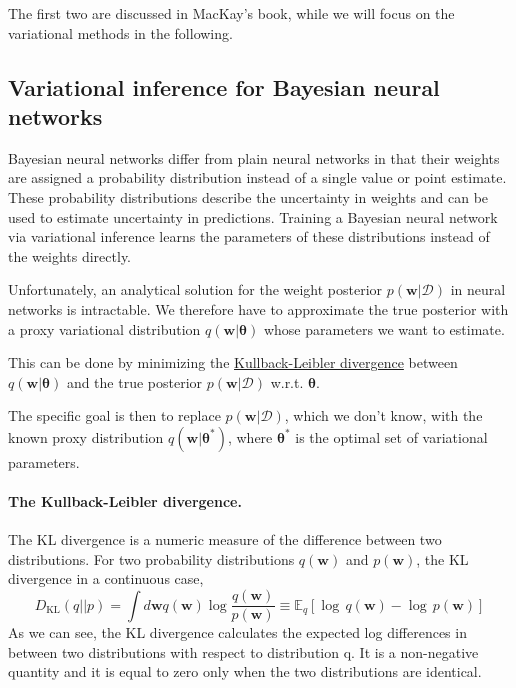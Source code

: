 \documentclass[%
oneside,                 %
final,                   %
10pt]{article}
\begin{document}
\noindent
The first two are discussed in MacKay's book, while we will focus on the variational methods in the following.

\subsection{Variational inference for Bayesian neural networks}

Bayesian neural networks differ from plain neural networks in that their weights are assigned a probability distribution instead of a single value or point estimate. These probability distributions describe the uncertainty in weights and can be used to estimate uncertainty in predictions. Training a Bayesian neural network via variational inference learns the parameters of these distributions instead of the weights directly.

Unfortunately, an analytical solution for the weight posterior $p(\boldsymbol{w} \lvert \mathcal{D})$ in neural networks is intractable. We therefore have to approximate the true posterior with a proxy variational distribution $q(\boldsymbol{w} \lvert \boldsymbol{\theta})$ whose parameters we want to estimate. 

This can be done by minimizing the \href{{https://en.wikipedia.org/wiki/Kullback%E2%80%93Leibler_divergence}}{Kullback-Leibler divergence} between $q(\boldsymbol{w} \lvert \boldsymbol{\theta})$ and the true posterior $p(\boldsymbol{w} \lvert \mathcal{D})$  w.r.t. $\boldsymbol{\theta}$.

The specific goal is then to replace $p(\boldsymbol{w} \lvert \mathcal{D})$, which we don't know, with the known proxy distribution $q(\boldsymbol{w} \lvert \boldsymbol{\theta}^*)$, where $\boldsymbol{\theta}^*$ is the optimal set of variational parameters. 

\paragraph{The Kullback-Leibler divergence.}
The KL divergence is a numeric measure of the difference between two distributions. For two probability distributions $q(\boldsymbol{w})$ and $p(\boldsymbol{w})$, the KL divergence in a continuous case,
\[ D_\mathrm{KL}(q||p) = \int d \boldsymbol{w} q(\boldsymbol{w}) \log \frac{q(\boldsymbol{w})}{p(\boldsymbol{w})} \equiv \mathbb{E}_{q} \left[ \log \, q(\boldsymbol{w}) - \log \, p(\boldsymbol{w}) \right] \]
As we can see, the KL divergence calculates the expected log differences in between two distributions with respect to distribution q. It is a non-negative quantity and it is equal to zero only when the two distributions are identical.
\end{document}
